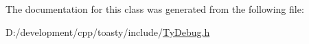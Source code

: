 \label{class_ty_debug_af91ad34c65fc57b3e6809defb5a29a26}


The documentation for this class was generated from the following file:\begin{DoxyCompactItemize}
\item 
D:/development/cpp/toasty/include/\hyperlink{_ty_debug_8h}{TyDebug.h}\end{DoxyCompactItemize}
